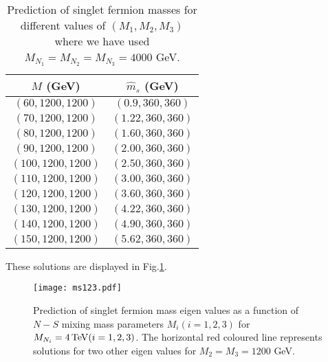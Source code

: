 \documentclass[a4paper,11pt]{article}
\begin{document}
\begin{table}[!h]
\caption{Prediction of singlet fermion masses for different values of
  $(M_1,M_2,M_3)$ where we have used  $M_{N_1}=M_{N_2}=M_{N_3}= 4000$ GeV. }
\begin{center}
\begin{tabular}{|c|c|}
\hline
{ $M$ (GeV)} & {$\hat{m}_s$ (GeV)} \\
\hline
$(60,1200,1200)$ & $(0.9,360,360)$ \\
\hline
$(70,1200,1200)$ & $(1.22,360,360)$ \\
\hline
$(80,1200,1200)$ & $(1.60,360,360)$ \\
\hline
$(90,1200,1200)$ & $(2.00,360,360)$ \\
\hline
$(100,1200,1200)$ & $(2.50,360,360)$ \\
\hline
$(110,1200,1200)$ & $(3.00,360,360)$ \\
\hline
$(120,1200,1200)$ & $(3.60,360,360)$ \\
\hline
$(130,1200,1200)$ & $(4.22,360,360)$ \\
\hline
$(140,1200,1200)$ & $(4.90,360,360)$ \\
\hline
$(150,1200,1200)$ & $(5.62,360,360)$ \\
\hline
\end{tabular}
\end{center}
\label{tab:msMi}
\end{table}
These solutions are displayed in Fig.\ref{fig:msM}. 
\begin{figure}[htbp]
 \texttt{[image: ms123.pdf]}
 \caption{Prediction of singlet fermion mass eigen values as a function of $N-S$ mixing mass parameters $M_i(i=1,2,3)$ for $M_{N_i}= 4\, {\rm TeV} (i=1,2,3)$. The horizontal red coloured line represents solutions for two other eigen values for $M_2=M_3=1200$ GeV.} 
 \label{fig:msM}
\end{figure}
\end{document}
